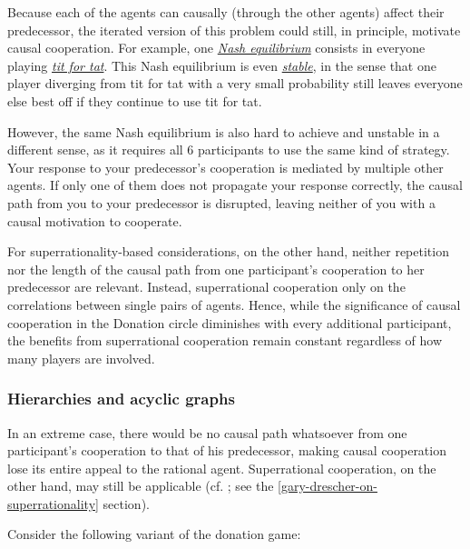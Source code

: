 Because each of the agents can causally (through the other agents)
affect their predecessor, the iterated version of this problem could
still, in principle, motivate causal cooperation. For example, one
\href{https://en.wikipedia.org/wiki/Nash_equilibrium}{\emph{Nash
equilibrium}} consists in everyone playing
\href{https://en.wikipedia.org/wiki/Tit_for_tat}{\emph{tit for tat}}.
This Nash equilibrium is even
\href{https://en.wikipedia.org/wiki/Nash_equilibrium\#Stability}{\emph{stable}},
in the sense that one player diverging from tit for tat with a very
small probability still leaves everyone else best off if they continue
to use tit for tat.

However, the same Nash equilibrium is also hard to achieve and unstable
in a different sense, as it requires all 6 participants to use the same
kind of strategy. Your response to your predecessor's cooperation is
mediated by multiple other agents. If only one of them does not
propagate your response correctly, the causal path from you to your
predecessor is disrupted, leaving neither of you with a causal
motivation to cooperate.

For superrationality-based considerations, on the other hand, neither
repetition nor the length of the causal path from one participant's
cooperation to her predecessor are relevant. Instead, superrational
cooperation only on the correlations between single pairs of agents.
Hence, while the significance of causal cooperation in the Donation
circle diminishes with every additional participant, the benefits from
superrational cooperation remain constant regardless of how many players
are involved.

\hypertarget{hierarchies-and-acyclic-graphs}{\subsubsection{Hierarchies
and acyclic graphs}\label{hierarchies-and-acyclic-graphs}}

In an extreme case, there would be no causal path whatsoever from one
participant's cooperation to that of his predecessor, making causal
cooperation lose its entire appeal to the rational agent. Superrational
cooperation, on the other hand, may still be applicable (cf.
\cite{Drescher2006-ky}; see the
\ref{gary-drescher-on-superrationality} section).

Consider the following variant of the donation game:

